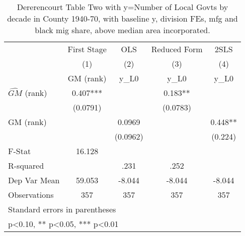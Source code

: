 \begin{table}[htbp]\centering
\def\sym#1{\ifmmode^{#1}\else\(^{#1}\)\fi}
\caption{Dererencourt Table Two with y=Number of Local Govts by decade in County 1940-70, with baseline y, division FEs, mfg and black mig share, above median area incorporated.}
\begin{tabular}{l*{4}{c}}
\toprule
                    & First Stage   &         OLS   &Reduced Form   &        2SLS   \\
                    &\multicolumn{1}{c}{(1)}&\multicolumn{1}{c}{(2)}&\multicolumn{1}{c}{(3)}&\multicolumn{1}{c}{(4)}\\
                    &\multicolumn{1}{c}{GM  (rank)}&\multicolumn{1}{c}{y\_L0}&\multicolumn{1}{c}{y\_L0}&\multicolumn{1}{c}{y\_L0}\\
\midrule
$\hat{GM}$ (rank)   &       0.407***&               &       0.183** &               \\
                    &    (0.0791)   &               &    (0.0783)   &               \\
\addlinespace
GM  (rank)          &               &      0.0969   &               &       0.448** \\
                    &               &    (0.0962)   &               &     (0.224)   \\
\midrule
F-Stat              &      16.128   &               &               &               \\
R-squared           &               &        .231   &        .252   &               \\
Dep Var Mean        &      59.053   &      -8.044   &      -8.044   &      -8.044   \\
Observations        &         357   &         357   &         357   &         357   \\
\bottomrule
\multicolumn{5}{l}{\footnotesize Standard errors in parentheses}\\
\multicolumn{5}{l}{\footnotesize * p<0.10, ** p<0.05, *** p<0.01}\\
\end{tabular}
\end{table}
